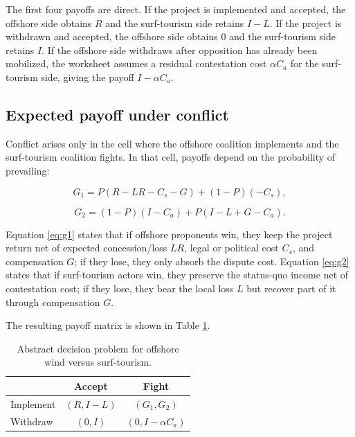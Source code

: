 The first four payoffs are direct. If the project is implemented and accepted, the offshore side obtains $R$ and the surf-tourism side retains $I-L$. If the project is withdrawn and accepted, the offshore side obtains $0$ and the surf-tourism side retains $I$. If the offshore side withdraws after opposition has already been mobilized, the worksheet assumes a residual contestation cost $\alpha C_a$ for the surf-tourism side, giving the payoff $I-\alpha C_a$.

\subsection{Expected payoff under conflict}

Conflict arises only in the cell where the offshore coalition implements and the surf-tourism coalition fights. In that cell, payoffs depend on the probability of prevailing:

\begin{equation}
G_1 = P(R-LR-C_s-G) + (1-P)(-C_s),
\label{eq:g1}
\end{equation}

\begin{equation}
G_2 = (1-P)(I-C_a) + P(I-L+G-C_a).
\label{eq:g2}
\end{equation}

Equation \ref{eq:g1} states that if offshore proponents win, they keep the project return net of expected concession/loss $LR$, legal or political cost $C_s$, and compensation $G$; if they lose, they only absorb the dispute cost. Equation \ref{eq:g2} states that if surf-tourism actors win, they preserve the status-quo income net of contestation cost; if they lose, they bear the local loss $L$ but recover part of it through compensation $G$.

The resulting payoff matrix is shown in Table \ref{tab:abstract_game}.

\begin{table}[H]
\centering
\caption{Abstract decision problem for offshore wind versus surf-tourism.}
\label{tab:abstract_game}
\begin{tabular}{lcc}
\toprule
 & Accept & Fight \\
\midrule
Implement & $(R, I-L)$ & $(G_1, G_2)$ \\
Withdraw & $(0, I)$ & $(0, I-\alpha C_a)$ \\
\bottomrule
\end{tabular}
\end{table}

